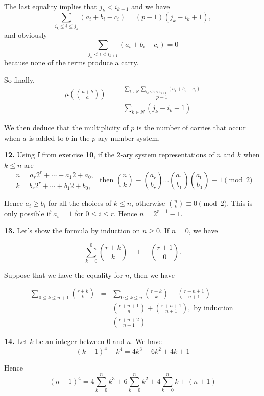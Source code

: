 \documentclass[a4paper,12pt]{article}
\newcommand{\newpar}[1]{\bigskip \noindent \textbf{#1.}}
\begin{document}
The last equality implies that $j_k < i_{k+1}$ and we have
\[ \sum_{i_k \le i \le j_k} (a_i + b_i - c_i) = (p-1) (j_k - i_k +
1),\]
and obviously
\[ \sum_{j_k < i < i_{k+1}} (a_i + b_i - c_i) = 0\]
because none of the terms produce a carry.

So finally,
\begin{eqnarray*}
  \mu\left( {{a+b} \choose a}\right) &=& \frac{\sum_{k \in N} \sum_{i_k \le i
      < i_{k+1}} (a_i + b_i - c_i)}{p-1} \\
  &=& \sum_{k \in N} (j_k - i_k + 1)
\end{eqnarray*}

We then deduce that the multiplicity of $p$ is the number of carries
that occur when $a$ is added to $b$ in the $p$-ary number system.

\newpar{12} Using \textbf{f} from exercise \textbf{10}, if the $2$-ary
system representations of $n$ and $k$ when $k \le n$ are
\[
\begin{array}{l}
  n = a_r 2^r + \cdots + a_1 2 + a_0, \\
  k = b_r 2^r + \cdots + b_1 2 + b_0,
\end{array}
\mbox{ then } {n \choose k} \equiv {{a_r} \choose {b_r}} \ldots {{a_1}
  \choose {b_1}}
{{a_0} \choose {b_0}} \equiv 1 \pmod 2
\]

Hence $a_i \ge b_i$ for all the choices of $k \le n$, otherwise ${n
  \choose k}
\equiv 0 \pmod 2$. This is only possible if $a_i = 1$ for $0 \le i \le
r$.  Hence $n = 2^{r+1}-1$.

\newpar{13} Let's show the formula by induction on $n \ge 0$.  If
$n=0$, we have

\[ \sum_{k=0}^0 {{r+k} \choose k} = 1 = {{r+1} \choose 0}.\]

Suppose that we have the equality for $n$, then we have

\begin{eqnarray*}
  \sum_{0\le k\le n+1}{{r+k} \choose k} &=& \sum_{0\le k \le n}{{r+k}
    \choose k} +
  {{r+n+1} \choose {n+1}} \\
  &=& {{r+n+1} \choose n} + {{r+n+1} \choose {n+1}}, \mbox{ by induction } \\
  &=& {{r+n+2} \choose {n+1}}
\end{eqnarray*}

\newpar{14} Let $k$ be an integer between $0$ and $n$.  We have
\[ (k+1)^4 - k^4 = 4 k^3 + 6 k^2 + 4 k + 1\]

Hence
\[ (n+1)^4 = 4 \sum_{k=0}^n k^3 + 6 \sum_{k=0}^n k^2 + 4 \sum_{k=0}^n k
+ (n+1)\]
\end{document}
